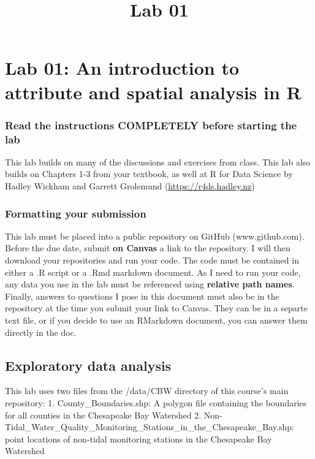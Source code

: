 \documentclass[]{article}
\title{Lab 01}
\author{}
\date{}
\makeatletter
\renewcommand{\maketitle}{\bgroup\vspace*{-1cm}\setlength{\parindent}{0pt}
\begin{flushleft}
  \@author
  
  \@date
  
\end{flushleft}\egroup
}
\makeatother
\begin{document}
\maketitle

\section{Lab 01: An introduction to attribute and spatial analysis in
R}\label{lab-01-an-introduction-to-attribute-and-spatial-analysis-in-r}

\subsubsection{Read the instructions COMPLETELY before starting the
lab}\label{read-the-instructions-completely-before-starting-the-lab}

This lab builds on many of the discussions and exercises from class.
This lab also builds on Chapters 1-3 from your textbook, as well at R
for Data Science by Hadley Wickham and Garrett Grolemund
(\url{https://r4ds.hadley.nz})

\subsubsection{Formatting your
submission}\label{formatting-your-submission}

This lab must be placed into a public repository on GitHub
(www.github.com). Before the due date, submit \textbf{on Canvas} a link
to the repository. I will then download your repositories and run your
code. The code must be contained in either a .R script or a .Rmd
markdown document. As I need to run your code, any data you use in the
lab must be referenced using \textbf{relative path names}. Finally,
answers to questions I pose in this document must also be in the
repository at the time you submit your link to Canvas. They can be in a
separte text file, or if you decide to use an RMarkdown document, you
can answer them directly in the doc.

\subsection{Exploratory data analysis}\label{exploratory-data-analysis}

This lab uses two files from the /data/CBW directory of this course's
main repository: 1. County\_Boundaries.shp: A polygon file containing
the boundaries for all counties in the Chesapeake Bay Watershed 2.
Non-Tidal\_Water\_Quality\_Monitoring\_Stations\_in\_the\_Chesapeake\_Bay.shp:
point locations of non-tidal monitoring stations in the Chesapeake Bay
Watershed
\end{document}
